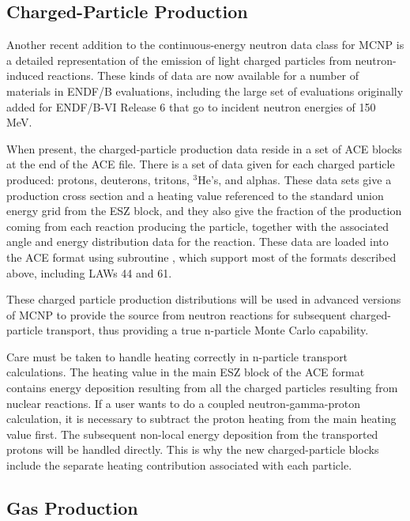 \subsection{Charged-Particle Production}
\label{ssACER_CP}

Another recent addition to the continuous-energy neutron data
class for MCNP is a detailed representation of the emission of
light charged particles from neutron-induced reactions.  These
kinds of data are now available for a number of materials in
ENDF/B evaluations, including the large set of evaluations
originally added for ENDF/B-VI Release 6 that go to incident
neutron energies of 150 MeV.

When present, the charged-particle production data reside in
a set of ACE blocks at the end of the ACE file.  There is a set
of data given for each charged particle produced: protons, deuterons,
tritons, $^{3}$He's, and alphas.  These data sets give a production
cross section and a heating value referenced to the standard
union energy grid from the ESZ block, and they also give the
fraction of the production coming from each reaction producing
the particle, together with the associated angle and energy
distribution data for the reaction.  These data are loaded into the
ACE format using subroutine ,
which support most of the formats described above, including
LAWs 44 and 61.

These charged particle production distributions will be used in
advanced versions of MCNP to provide the source from neutron reactions
for subsequent charged-particle transport, thus providing a true
n-particle Monte Carlo capability.

Care must be taken to handle heating correctly in n-particle
transport calculations.  The heating value in the main ESZ block of
the ACE format contains energy deposition resulting from all the
charged particles resulting from nuclear reactions.  If a user
wants to do a coupled neutron-gamma-proton calculation, it is
necessary to subtract the proton heating from the main heating
value first.  The subsequent non-local energy deposition from the
transported protons will be handled directly.  This is why the
new charged-particle blocks include the separate heating contribution
associated with each particle.

\subsection{Gas Production}
\label{ssACER_gasprod}


